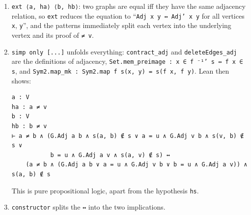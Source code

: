 \documentclass[11pt,a4paper]{article}
\newcommand{\lean}[1]{\texttt{\textcolor{leanink}{#1}}}
\newcommand{\how}{\par\smallskip{\sffamily\bfseries\color{accent}Proof, step by step.}\enspace}
\begin{document}
\how
\begin{enumerate}
\item \lean{ext ⟨a, ha⟩ ⟨b, hb⟩}: two graphs are equal iff they have the same adjacency relation, so
  \lean{ext} reduces the equation to “\lean{Adj x y ↔ Adj' x y} for all vertices \lean{x}, \lean{y}”,
  and the patterns immediately split each vertex into the underlying vertex and its proof of
  \lean{≠ v}.
\item \lean{simp only [...]} unfolds everything: \lean{contract\_\allowbreak{}adj} and \lean{deleteEdges\_\allowbreak{}adj}
  are the definitions of adjacency, \lean{Set.mem\_\allowbreak{}preimage : x ∈ f ⁻¹' s ↔ f x ∈ s}, and
  \lean{Sym2.map\_\allowbreak{}mk : Sym2.map f s(x, y) = s(f x, f y)}. Lean then shows:
\begin{leansays}
\begin{Verbatim}[fontsize=\footnotesize]
a : V
ha : a ≠ v
b : V
hb : b ≠ v
⊢ a ≠ b ∧ (G.Adj a b ∧ s(a, b) ∉ s ∨ a = u ∧ G.Adj v b ∧ s(v, b) ∉ s ∨
           b = u ∧ G.Adj a v ∧ s(a, v) ∉ s) ↔
    (a ≠ b ∧ (G.Adj a b ∨ a = u ∧ G.Adj v b ∨ b = u ∧ G.Adj a v)) ∧ s(a, b) ∉ s
\end{Verbatim}
\end{leansays}
  This is pure propositional logic, apart from the hypothesis \lean{hs}.
\item \lean{constructor} splits the \lean{↔} into the two implications.
\end{enumerate}
\end{document}
